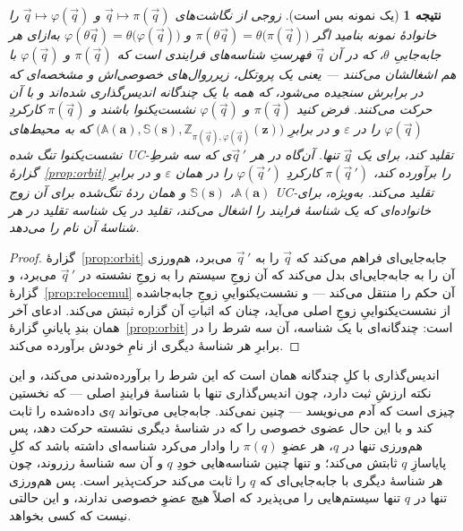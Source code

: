 \documentclass[10pt,oneside,openany]{book}
\newcommand{\bd}[1]{\mathbf{#1}}
\newcommand{\Aset}{\mathbb{A}}
\newcommand{\SimSet}{\mathbb{S}}
\newcommand{\ZenvSet}{\mathbb{Z}}
\theoremstyle{accentdef}
\theoremstyle{accentplain}
\newtheorem{corollary}[definition]{نتیجه}
\begin{document}
\begin{corollary}[یک نمونه بس است]\label{cor:onepid}
زوجی از نگاشت‌های $\vec q \mapsto \pi(\vec q)$ و $\vec q \mapsto
\varphi(\vec q)$ را \emph{خانوادهٔ نمونه} بنامید اگر $\pi(\theta\vec q) =
\theta\bigl(\pi(\vec q)\bigr)$ و $\varphi(\theta\vec q) =
\theta\bigl(\varphi(\vec q)\bigr)$ به‌ازای هر جابه‌جاییِ $\theta$، که در آن
$\vec q$ فهرستِ شناسه‌های فرایندی است که $\pi(\vec q)$ و $\varphi(\vec q)$
با هم اشغالشان می‌کنند --- یعنی یک پروتکل، زیرروال‌های خصوصی‌اش و مشخصه‌ای
که در برابرش سنجیده می‌شود، که همه با یک چندگانه اندیس‌گذاری شده‌اند و با آن
حرکت می‌کنند. فرض کنید $\pi(\vec q)$ و $\varphi(\vec q)$ نشست‌یکنوا باشند و
$\pi(\vec q)$ کارکردِ $\varphi(\vec q)$ را در $\varepsilon$ و در برابرِ
$\bigl(\Aset(\bd{a}),\SimSet(\bd{s}),\ZenvSet_{\pi(\vec q),\varphi(\vec
q)}(\bd{z})\bigr)$ که به محیط‌های نشست‌یکنوا تنگ شده UC-تقلید کند، برای یک
$\vec q$ِ تنها. آن‌گاه در هر $\vec q\,'$ی که سه شرطِ
گزارهٔ~\ref{prop:orbit} را برآورده کند، $\pi(\vec q\,')$ کارکردِ
$\varphi(\vec q\,')$ را در همان $\varepsilon$ و در برابرِ $\Aset(\bd{a})$،
$\SimSet(\bd{s})$ و همان ردهٔ تنگ‌شده برای آن زوج UC-تقلید می‌کند. به‌ویژه،
برای خانواده‌ای که یک شناسهٔ فرایند را اشغال می‌کند، تقلید در یک شناسه
تقلید در هر شناسهٔ آن نام را می‌دهد.
\end{corollary}

\begin{proof}
گزارهٔ~\ref{prop:orbit} جابه‌جایی‌ای فراهم می‌کند که $\vec q$ را به $\vec
q\,'$ می‌برد، هم‌ورزی آن را به جابه‌جایی‌ای بدل می‌کند که آن زوجِ سیستم را
به زوجِ نشسته در $\vec q\,'$ می‌برد، و گزارهٔ~\ref{prop:relocemul} آن حکم را
منتقل می‌کند --- و نشست‌یکنواییِ زوجِ جابه‌جا‌شده از نشست‌یکنواییِ زوجِ اصلی
می‌آید، چنان که اثباتِ آن گزاره ثبتش می‌کند. ادعای آخر همان بندِ پایانیِ
گزارهٔ~\ref{prop:orbit} است: چندگانه‌ای با یک شناسه، آن سه شرط را در برابرِ
هر شناسهٔ دیگری از نامِ خودش برآورده می‌کند.
\end{proof}

اندیس‌گذاری با کلِ چندگانه همان است که این شرط را برآورده‌شدنی می‌کند، و این
نکته ارزشِ ثبت دارد، چون اندیس‌گذاری تنها با شناسهٔ فرایندِ اصلی --- که
نخستین چیزی است که آدم می‌نویسد --- چنین نمی‌کند. جابه‌جایی می‌تواند $q$ی
داده‌شده را ثابت کند و با این حال عضوی خصوصی را که در شناسهٔ دیگری نشسته
حرکت دهد، پس هم‌ورزی تنها در $q$، هر عضوِ $\pi(q)$ را وادار می‌کرد شناسه‌ای
داشته باشد که کلِ پایاسازِ $q$ ثابتش می‌کند؛ و تنها چنین شناسه‌هایی خودِ $q$
و آن سه شناسهٔ رزروند، چون هر شناسهٔ دیگری با جابه‌جایی‌ای که $q$ را ثابت
می‌کند حرکت‌پذیر است. پس هم‌ورزی تنها در $q$ تنها سیستم‌هایی را می‌پذیرد که
اصلاً هیچ عضوِ خصوصی ندارند، و این حالتی نیست که کسی بخواهد.
\end{document}
